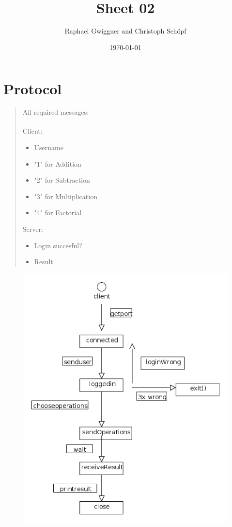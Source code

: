 \documentclass[10pt]{ps-exercise}
\author{Raphael Gwiggner and Christoph Sch\"opf}
\date{\today}
\title{Sheet 02}
\begin{document}
\section{Protocol}
\begin{quote}
All required messages: \\ \\
Client:
\begin{itemize}
\item Username
\item "1" for Addition
\item "2" for Subtraction
\item "3" for Multiplication
\item "4" for Factorial
\end{itemize}
Server:
\begin{itemize}
\item Login succesful?
\item Result
\end{itemize}
\end{quote}
\begin{figure}[H]
\includegraphics[scale=0.6]{client.png}
\end{figure}
\end{document}

